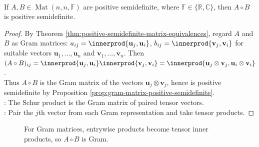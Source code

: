 \begin{theorem} \label{thm:schur-product-theorem} \\
If $A,B\in\operatorname{Mat}(n,n,\mathbb{F})$ are positive semidefinite, where $\mathbb{F}\in\{\mathbb{R},\mathbb{C}\}$, then $A\circ B$ is positive semidefinite.
\begin{proof}
By Theorem \ref{thm:positive-semidefinite-matrix-equivalences}, regard $A$ and $B$ as Gram matrices: $a_{ij}=\innerprod{\mathbf{u}_j,\mathbf{u}_i}$, $b_{ij}=\innerprod{\mathbf{v}_j,\mathbf{v}_i}$ for suitable vectors $\mathbf{u}_1,\ldots,\mathbf{u}_n$ and $\mathbf{v}_1,\ldots,\mathbf{v}_n$. Then $(A\circ B)_{ij} =\innerprod{\mathbf{u}_j,\mathbf{u}_i}\innerprod{\mathbf{v}_j,\mathbf{v}_i} =\innerprod{\mathbf{u}_j\otimes\mathbf{v}_j,\mathbf{u}_i\otimes\mathbf{v}_i}$.\\
Thus $A\circ B$ is the Gram matrix of the vectors $\mathbf{u}_j\otimes\mathbf{v}_j$, hence is positive semidefinite by Proposition \ref{prop:gram-matrix-positive-semidefinite}.\\
: The Schur product is the Gram matrix of paired tensor vectors.\\
: Pair the $j$th vector from each Gram representation and take tensor products.
\end{proof}
\end{theorem}

\begin{figure}[H]
  \centering
  
  \caption{For Gram matrices, entrywise products become tensor inner products, so $A\circ B$ is Gram.}
  \label{fig:schur-product-gram}
\end{figure}

